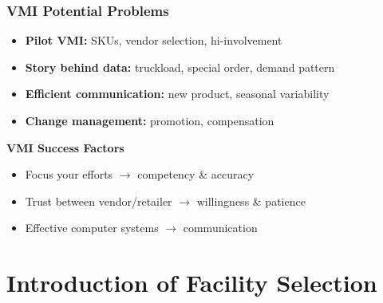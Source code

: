 \documentclass[10pt,handout,notes=show]{beamer}
\begin{document}
  \begin{frame}
  \frametitle{VMI Potential Problems}

    \begin{itemize}
      \item \textbf{Pilot VMI:} SKUs, vendor selection, hi-involvement
      \item \textbf{Story behind data:} truckload, special order, demand pattern
      \item \textbf{Efficient communication:} new product, seasonal variability
      \item \textbf{Change management:} promotion, compensation
    \end{itemize}

    \NextHalfLine
    \textbf{VMI Success Factors}
    \begin{itemize}
      \item Focus your \alert{efforts} $\rightarrow$ competency \& accuracy
      \item Trust between vendor/retailer $\rightarrow$ willingness  \& patience
      \item Effective computer systems $\rightarrow$ \alert{communication}
    \end{itemize}


  \end{frame}


\section[FacSelection]{Introduction of Facility Selection}
\end{document}
